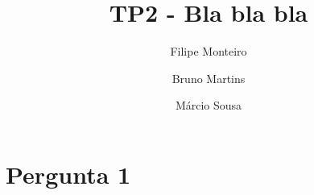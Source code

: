 \documentclass{article}
\begin{document}
\title{TP2 - Bla bla bla}

\author{Filipe Monteiro \and Bruno Martins \and Márcio Sousa}


\section{Pergunta 1}

    
\maketitle
\end{document}

